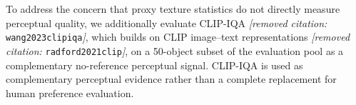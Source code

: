 \documentclass[times,twocolumn,final]{elsarticle}
\providecommand{\DIFdel}[1]{{\protect\color{red} \scriptsize #1}} %
\providecommand{\DIFdelbegin}{} %
\begin{document}
\DIFdelbegin %
\DIFdel{To address the concern that proxy texture statistics do not directly measure perceptual quality, we additionally evaluate CLIP-IQA \textit{[removed citation: }\texttt{wang2023clipiqa}\textit{]}, which builds on CLIP image--text representations \textit{[removed citation: }\texttt{radford2021clip}\textit{]}, on a 50-object subset of the evaluation pool as a complementary no-reference perceptual signal. CLIP-IQA is used as complementary perceptual evidence rather than a complete replacement for human preference evaluation.
}%

\end{document}
